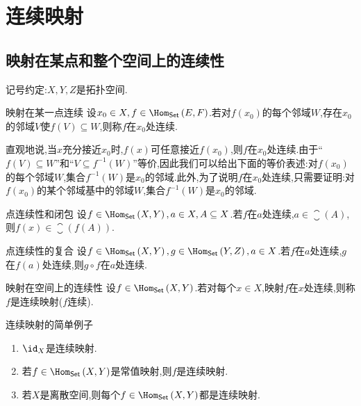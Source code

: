 \chapter{连续映射}

\section{映射在某点和整个空间上的连续性}

记号约定:$X,Y,Z$是拓扑空间.

\begin{definition}{映射在某一点连续}{}
	设$x_{0}\in X,f\in\Hom_{\mathsf{Set}}\left(E,F\right)$.若对$f\left(x_{0}\right)$的每个邻域$W$,存在$x_{0}$的邻域$V$使$f\left(V\right)\subseteq W$,则称$f$在$x_{0}$处连续.
\end{definition}

\begin{remark}{}{}
	直观地说,当$x$充分接近$x_{0}$时,$f\left(x\right)$可任意接近$f\left(x_{0}\right)$,则$f$在$x_{0}$处连续.由于``$f\left(V\right)\subseteq W$''和``$V\subseteq f^{-1}\left(W\right)$''等价,因此我们可以给出下面的等价表述:对$f\left(x_{0}\right)$的每个邻域$W$,集合$f^{-1}\left(W\right)$是$x_{0}$的邻域.此外,为了说明$f$在$x_{0}$处连续,只需要证明:对$f\left(x_{0}\right)$的某个邻域基中的邻域$W$,集合$f^{-1}\left(W\right)$是$x_{0}$的邻域.
\end{remark}

\begin{proposition}{点连续性和闭包}{}
	设$f\in\Hom_{\mathsf{Set}}\left(X,Y\right),a\in X,A\subseteq X$.若$f$在$a$处连续,$a\in\closure\left(A\right)$,则$f\left(x\right)\in\closure\left(f\left(A\right)\right)$.
\end{proposition}

\begin{proposition}{点连续性的复合}{}
	设$f\in\Hom_{\mathsf{Set}}\left(X,Y\right),g\in\Hom_{\mathsf{Set}}\left(Y,Z\right),a\in X$.若$f$在$a$处连续,$g$在$f\left(a\right)$处连续,则$g\circ f$在$a$处连续.
\end{proposition}

\begin{definition}{映射在空间上的连续性}{}
	设$f\in\Hom_{\mathsf{Set}}\left(X,Y\right)$.若对每个$x\in X$,映射$f$在$x$处连续,则称$f$是连续映射($f$连续).
\end{definition}

\begin{example}{连续映射的简单例子}{}
	\begin{enumerate}
		\item $\id_{X}$是连续映射.
		\item 若$f\in\Hom_{\mathsf{Set}}\left(X,Y\right)$是常值映射,则$f$是连续映射.
		\item 若$X$是离散空间,则每个$f\in\Hom_{\mathsf{Set}}\left(X,Y\right)$都是连续映射.
	\end{enumerate}
\end{example}

